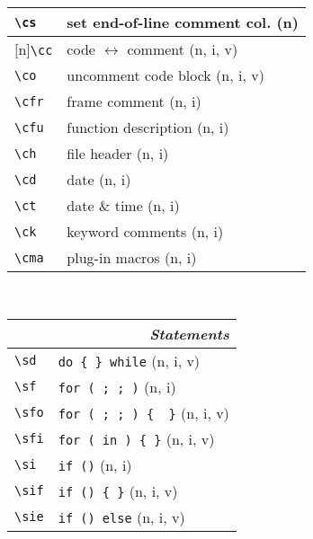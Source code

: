 \documentclass[oneside,10pt,landscape,DIV16]{scrartcl}
\newcommand{\Rep}{{\scriptsize{[n]}}}
\begin{document}
\begin{multicols}{3}
\begin{center}
\begin{tabular}[]{|p{11mm}|p{60mm}|}
\hline     \verb'\cs'   & set end-of-line comment col.      \hfill (n)      \\
%
\hline \Rep\verb'\cc'   & code $\leftrightarrow$ comment    \hfill (n, i, v)\\
\hline     \verb'\co'   & uncomment code block              \hfill (n, i, v)\\
%
\hline     \verb'\cfr'  & frame comment                     \hfill (n, i)   \\
\hline     \verb'\cfu'  & function description              \hfill (n, i)   \\
\hline     \verb'\ch'   & file header                       \hfill (n, i)   \\
\hline     \verb'\cd'   & date                              \hfill (n, i)   \\
\hline     \verb'\ct'   & date \& time                      \hfill (n, i)   \\
\hline     \verb'\ck'   & keyword comments                  \hfill (n, i)   \\
\hline     \verb'\cma'  & plug-in macros                    \hfill (n, i)   \\
\hline
\end{tabular}\\
%
%
\begin{tabular}[]{|p{11mm}|p{60mm}|}
\hline
\multicolumn{2}{|r|}{\textsl{\textbf{S}tatements}}                    \\[1.0ex]
\hline \verb'\sd'      & \verb'do { } while'          \hfill (n, i, v)\\
\hline \verb'\sf'      & \verb'for ( ; ; )'           \hfill (n, i)\\
\hline \verb'\sfo'     & \verb'for ( ; ; ) {  }'      \hfill (n, i, v)\\
\hline \verb'\sfi'     & \verb'for ( in ) { }'        \hfill (n, i, v)\\
\hline \verb'\si'      & \verb'if ()'                 \hfill (n, i)\\
\hline \verb'\sif'     & \verb'if () { }'             \hfill (n, i, v)\\
\hline \verb'\sie'     & \verb'if () else'            \hfill (n, i, v)\\

\end{tabular}
\end{center}
\end{multicols}
\end{document}
